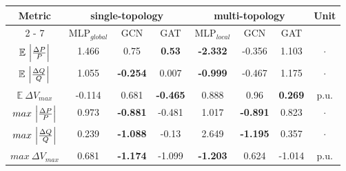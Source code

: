 \makegapedcells\begin{tabular}{|c||c|c|c||c|c|c||c|}%
                   \hline%
                   \multirow{2}{*}{Metric} & \multicolumn{3}{c||}{single{-}topology} & \multicolumn{3}{c||}{multi{-}topology}& \multirow{2}{*}{Unit}\\%
                   \cline{2%
                   -%
                   7}%
                   & MLP$_{global}$ & GCN               & GAT               & MLP$_{local}$     & GCN               & GAT            &         \\%
                   \hline%
                   $\mathbb{E} \ \Bigl|\frac{\Delta P}{P}\Bigr|$ & 1.466          & 0.75              & \textbf{0.53}     & \textbf{{-}2.332}& -0.356& 1.103& $\cdot$\\%
                   \hline%
                   $\mathbb{E} \ \Bigl|\frac{\Delta Q}{Q}\Bigr|$ & 1.055          & \textbf{{-}0.254} & 0.007             & \textbf{{-}0.999}& -0.467& 1.175& $\cdot$\\%
                   \hline%
                   $\mathbb{E} \ \Delta V_{max}$                 & -0.114         & 0.681             & \textbf{{-}0.465} & 0.888             & 0.96              & \textbf{0.269}& p.u.\\%
                   \hline%
                   $max \ \Bigl|\frac{\Delta P}{P}\Bigr|$        & 0.973          & \textbf{{-}0.881} & -0.481            & 1.017             & \textbf{{-}0.891}& 0.823& $\cdot$\\%
                   \hline%
                   $max \ \Bigl|\frac{\Delta Q}{Q}\Bigr|$        & 0.239          & \textbf{{-}1.088} & -0.13             & 2.649             & \textbf{{-}1.195}& 0.357& $\cdot$\\%
                   \hline%
                   $max \ \Delta V_{max}$                        & 0.681          & \textbf{{-}1.174} & -1.099            & \textbf{{-}1.203} & 0.624             & -1.014& p.u.\\%
                   \hline%
\end{tabular}